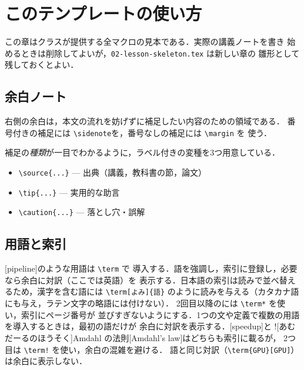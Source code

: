\documentclass[../main.tex]{subfiles}
\begin{document}
\chapter{このテンプレートの使い方}

この章はクラスが提供する全マクロの見本である．実際の講義ノートを書き
始めるときは削除してよいが，\texttt{02-lesson-skeleton.tex} は新しい章の
雛形として残しておくとよい．

\section{余白ノート}

右側の余白は，本文の流れを妨げずに補足したい内容のための領域である．
番号付きの補足には \verb|\sidenote|を，番号なしの補足には \verb|\margin| を
使う．

補足の\emph{種類}が一目でわかるように，ラベル付きの変種を3つ用意している．
\begin{itemize}
  \item \verb|\source{...}| --- 出典（講義，教科書の節，論文）
  \item \verb|\tip{...}| --- 実用的な助言
  \item \verb|\caution{...}| --- 落とし穴・誤解
\end{itemize}

\section{用語と索引}

[pipeline]のような用語は \verb|\term| で
導入する．語を強調し，索引に登録し，必要なら余白に対訳（ここでは英語）を
表示する．日本語の索引は読みで並べ替えるため，漢字を含む語には
\verb|\term[よみ]{語}| のように読みを与える（カタカナ語にも与え，ラテン文字の略語には付けない）．
2回目以降のには \verb|\term*| を使い，索引にページ番号が
並びすぎないようにする．1つの文や定義で複数の用語を導入するときは，最初の語だけが
余白に対訳を表示する．[speedup]と
\term![あむだーるのほうそく]{Amdahl の法則}[Amdahl's law]はどちらも索引に載るが，
2つ目は \verb|\term!| を使い，余白の混雑を避ける．
語と同じ対訳（\verb|\term{GPU}[GPU]|）は余白に表示しない．
\end{document}
